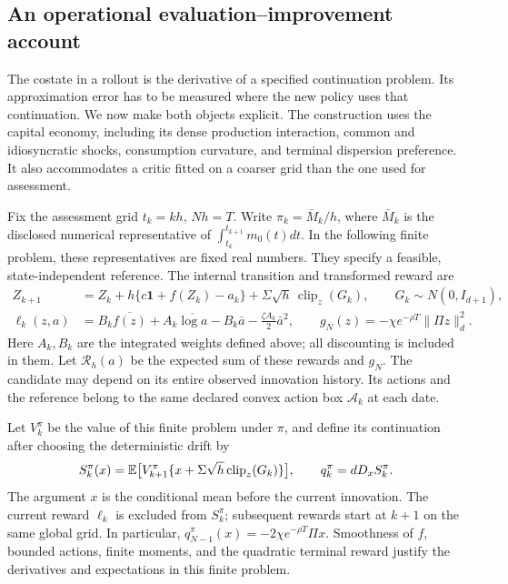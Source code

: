 \subsection{An operational evaluation--improvement account}
\label{sec:r15mechanism}
The costate in a rollout is the derivative of a specified continuation
problem. Its approximation error has to be measured where the new policy
uses that continuation. We now make both objects explicit. The construction
uses the capital economy, including its dense production interaction,
common and idiosyncratic shocks, consumption curvature, and terminal
dispersion preference. It also accommodates a critic fitted on a coarser
grid than the one used for assessment.

Fix the assessment grid $t_k=kh$, $Nh=T$. Write $\pi_k=\bar M_k/h$,
where $\bar M_k$ is the disclosed numerical representative of
$\int_{t_k}^{t_{k+1}}m_0(t)dt$. In the following finite problem, these
representatives are fixed real numbers. They specify a feasible,
state-independent reference. The internal transition and transformed
reward are
\begin{align}
 Z_{k+1}&=Z_k+h\{c\bm1+f(Z_k)-a_k\}
                  +\Sigma\sqrt h\,\operatorname{clip}_{z}(G_k),
       \qquad G_k\sim N(0,I_{d+1}),\label{eq:r15finite}\\
 \ell_k(z,a)&=B_k\overline{f(z)}+A_k\overline{\log a}
       -B_k\bar a-\frac{\zeta A_k}{2}\bar a^2,
       \qquad g_N(z)=-\chi e^{-\rho T}\|\Pi z\|_d^2.
       \label{eq:r15reward}
\end{align}
Here $A_k,B_k$ are the integrated weights defined above; all discounting
is included in them. Let $\mathcal R_h(a)$ be the expected sum of these
rewards and $g_N$. The candidate may depend on its entire observed
innovation history. Its actions and the reference belong to the same
declared convex action box $\mathcal A_k$ at each date.

Let $V_k^\pi$ be the value of this finite problem under $\pi$, and define
its continuation after choosing the deterministic drift by
\begin{equation}
 S_k^\pi(x)=\mathbb E\big[V_{k+1}^\pi
       \{x+\Sigma\sqrt h\operatorname{clip}_{z}(G_k)\}\big],
 \qquad q_k^\pi=dD_xS_k^\pi.
 \label{eq:r15postdecision}
\end{equation}
The argument $x$ is the conditional mean before the current innovation.
The current reward $\ell_k$ is excluded from $S_k^\pi$; subsequent
rewards start at $k+1$ on the same global grid. In particular,
$q_{N-1}^\pi(x)=-2\chi e^{-\rho T}\Pi x$. Smoothness of $f$, bounded
actions, finite moments, and the quadratic terminal reward justify the
derivatives and expectations in this finite problem.

